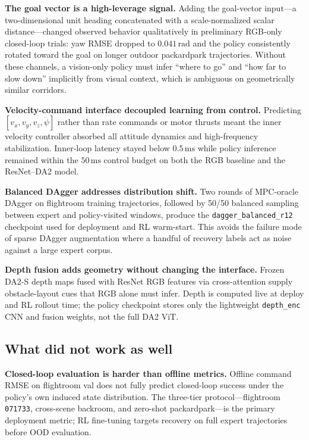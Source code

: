 \documentclass[10pt,twocolumn,letterpaper]{article}
\begin{document}
\textbf{The goal vector is a high-leverage signal.} Adding the goal-vector input---a two-dimensional unit heading concatenated with a scale-normalized scalar distance---changed observed behavior qualitatively in preliminary RGB-only closed-loop trials: yaw RMSE dropped to $0.041\,\mathrm{rad}$ and the policy consistently rotated toward the goal on longer outdoor packardpark trajectories. Without these channels, a vision-only policy must infer ``where to go'' and ``how far to slow down'' implicitly from visual context, which is ambiguous on geometrically similar corridors.

\textbf{Velocity-command interface decoupled learning from control.} Predicting $[v_x, v_y, v_z, \dot\psi]$ rather than rate commands or motor thrusts meant the inner velocity controller absorbed all attitude dynamics and high-frequency stabilization. Inner-loop latency stayed below $0.5\,\mathrm{ms}$ while policy inference remained within the $50\,\mathrm{ms}$ control budget on both the RGB baseline and the ResNet--DA2 model.

\textbf{Balanced DAgger addresses distribution shift.} Two rounds of MPC-oracle DAgger on flightroom training trajectories, followed by 50/50 balanced sampling between expert and policy-visited windows, produce the \texttt{dagger\_balanced\_r12} checkpoint used for deployment and RL warm-start. This avoids the failure mode of sparse DAgger augmentation where a handful of recovery labels act as noise against a large expert corpus.

\textbf{Depth fusion adds geometry without changing the interface.} Frozen DA2-S depth maps fused with ResNet RGB features via cross-attention supply obstacle-layout cues that RGB alone must infer. Depth is computed live at deploy and RL rollout time; the policy checkpoint stores only the lightweight \texttt{depth\_enc} CNN and fusion weights, not the full DA2 ViT.

\subsection{What did not work as well}

\textbf{Closed-loop evaluation is harder than offline metrics.} Offline command RMSE on flightroom val does not fully predict closed-loop success under the policy's own induced state distribution. The three-tier protocol---flightroom \texttt{071733}, cross-scene backroom, and zero-shot packardpark---is the primary deployment metric; RL fine-tuning targets recovery on full expert trajectories before OOD evaluation.
\end{document}
